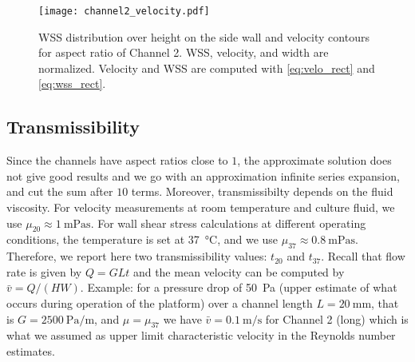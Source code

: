 \documentclass{article}
\begin{document}
\begin{figure}
    \centering
    \texttt{[image: channel2\_velocity.pdf]}
    \caption{WSS distribution over height on the side wall and velocity contours for aspect ratio of Channel 2. WSS, velocity, and width are normalized. Velocity and WSS are computed with \cref{eq:velo_rect} and \cref{eq:wss_rect}.}
    \label{fig:channel2}
\end{figure}

\subsection{Transmissibility}
Since the channels have aspect ratios close to $1$, the approximate solution does not give good results and we go with an approximation infinite series expansion, and cut the sum after $10$ terms. Moreover, transmissibilty depends on the fluid viscosity. For velocity measurements at room temperature and culture fluid, we use $\mu_{20} \approx \SI{1}{\milli\pascal\s}$. For wall shear stress calculations at different operating conditions, the temperature is set at \SI{37}{\celsius}, and we use $\mu_{37} \approx \SI{0.8}{\milli\pascal\s}$. Therefore, we report here two transmissibility values: $t_{20}$ and $t_{37}$. Recall that flow rate is given by $Q = GLt$ and the mean velocity can be computed by $\bar{v} = Q/(HW)$. Example: for a pressure drop of \SI{50}{\pascal} (upper estimate of what occurs during operation of the platform) over a channel length $L = \SI{20}{\milli\m}$, that is $G = \SI{2500}{\pascal\per\m}$, and $\mu = \mu_{37}$ we have $\bar{v} = \SI{0.1}{\m\per\s}$ for Channel 2 (long) which is what we assumed as upper limit characteristic velocity in the Reynolds number estimates.
\end{document}
